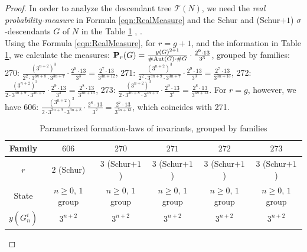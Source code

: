 \documentclass{amsart}
\theoremstyle{definition}
\theoremstyle{remark}
\begin{document}
\begin{proof}
In order to analyze the descendant tree \(\mathcal{T}(N)\), we need the \textit{real probability-measure}
in Formula
\eqref{eqn:RealMeasure}
and the Schur and (Schur\(+1\)) \(\sigma\)-descendants \(G\) of \(N\) in the Table
\ref{tbl:FormationLawsUnbounded}
\cite{BEO2005},
\cite{MAGMA6561}. \\
Using the Formula
\eqref{eqn:RealMeasure},
for \(r=g+1\),
and the information in Table
\ref{tbl:FormationLawsUnbounded},
we calculate the measures:
\({\bf P}_r(G)=\frac{y(G)^{2+1}}{\#\mathrm{Aut}(G)\cdot\#G}\cdot\frac{2^9\cdot 13}{3^3}\), grouped by families: 
270: \(\frac{(3^{n+2})^3}{2^2\cdot 3^{3n+8}\cdot 3^{3n+7}}\cdot\frac{2^9\cdot 13}{3^3}=\frac{2^7\cdot 13}{3^{3n+12}}\),
271: \(\frac{(3^{n+2})^3}{2^2\cdot 3^{3n+9}\cdot 3^{3n+7}}\cdot\frac{2^9\cdot 13}{3^3}=\frac{2^7\cdot 13}{3^{3n+13}}\),
272: \(\frac{(3^{n+2})^3}{2\cdot 3^{3n+9}\cdot 3^{3n+7}}\cdot\frac{2^9\cdot 13}{3^3}=\frac{2^8\cdot 13}{3^{3n+13}}\),
273: \(\frac{(3^{n+2})^3}{2\cdot 3^{3n+8}\cdot 3^{3n+7}}\cdot\frac{2^9\cdot 13}{3^3}=\frac{2^8\cdot 13}{3^{3n+12}}\).
For \(r=g\), however, we have 606:
\(\frac{(3^{n+2})^3}{2\cdot 3^{3n+9}\cdot 3^{3n+8}}\cdot\frac{2^8\cdot 13}{3^2}=\frac{2^7\cdot 13}{3^{3n+13}}\),
which coincides with 271.
\renewcommand{\arraystretch}{1.2}
\begin{table}[ht]
\caption{Parametrized formation-laws of invariants, grouped by families}
\label{tbl:FormationLawsUnbounded}
\begin{center}
\begin{tabular}{|c||c||c|c|c|c|}
\hline
 Family                    & \(606\)                           &  \(270\)                          &  \(271\)                          &  \(272\)                          &  \(273\)                          \\
\hline
 \(r\)                     & \(2\) (Schur)                     & \(3\) (Schur\(+1\))               & \(3\) (Schur\(+1\))               & \(3\) (Schur\(+1\))               & \(3\) (Schur\(+1\))               \\
 State                     & \(n\ge 0\), \(1\) group           & \(n\ge 0\), \(1\) group           & \(n\ge 0\), \(1\) group           & \(n\ge 0\), \(1\) group           & \(n\ge 0\), \(1\) group           \\
 \(y(G_n^i)\)              & \(3^{n+2}\)                       & \(3^{n+2}\)                       & \(3^{n+2}\)                       & \(3^{n+2}\)                       & \(3^{n+2}\)                       \\

\end{tabular}
\end{center}
\end{table}
\end{proof}
\end{document}
